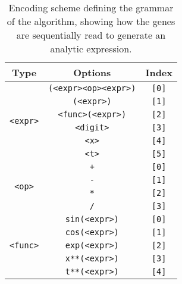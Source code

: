 \documentclass[multicolumn, 12pt]{extarticle}
\begin{document}
\begin{table}[h]
	\centering
	\caption{Encoding scheme defining the grammar of the algorithm, showing how the genes are sequentially read to generate an analytic expression.}
	\label{tab:grammar}
	\begin{tabular}{ccc}
		\toprule
		Type & Options                                         & Index                             \\
		\midrule

		\multirow{6}{*}{\texttt{<expr>}}
		     & \multicolumn{1}{c}{\texttt{(<expr><op><expr>)}} & \multicolumn{1}{c}{\texttt{[0]}}  \\
		     & \multicolumn{1}{c}{\texttt{(<expr>)}}           & \multicolumn{1}{c}{\texttt{[1]}}  \\
		     & \multicolumn{1}{c}{\texttt{<func>(<expr>)}}     & \multicolumn{1}{c}{\texttt{[2]}}  \\
		     & \multicolumn{1}{c}{\texttt{<digit>}}            & \multicolumn{1}{c}{\texttt{[3]}}  \\
		     & \multicolumn{1}{c}{\texttt{<x>}}                & \multicolumn{1}{c}{\texttt{[4]}}  \\
		     & \multicolumn{1}{c}{\texttt{<t>}}                & \multicolumn{1}{c}{\texttt{[5]}}  \\

		\midrule

		\multirow{4}{*}{\texttt{<op>}}
		     & \multicolumn{1}{c}{\texttt{+}}                  & \multicolumn{1}{c}{\texttt{[0]}}  \\
		     & \multicolumn{1}{c}{\texttt{-}}                  & \multicolumn{1}{c}{\texttt{[1]}}  \\
		     & \multicolumn{1}{c}{\texttt{*}}                  & \multicolumn{1}{c}{\texttt{[2]}}  \\
		     & \multicolumn{1}{c}{\texttt{/}}                  & \multicolumn{1}{c}{\texttt{[3]}}  \\

		\midrule

		\multirow{5}{*}{\texttt{<func>}}
		     & \multicolumn{1}{c}{\texttt{sin(<expr>)}}        & \multicolumn{1}{c}{\texttt{[0]}}  \\
		     & \multicolumn{1}{c}{\texttt{cos(<expr>)}}        & \multicolumn{1}{c}{\texttt{[1]}}  \\
		     & \multicolumn{1}{c}{\texttt{exp(<expr>)}}        & \multicolumn{1}{c}{\texttt{[2]}}  \\
		     & \multicolumn{1}{c}{\texttt{x**(<expr>)}}        & \multicolumn{1}{c}{\texttt{[3]}}  \\
		     & \multicolumn{1}{c}{\texttt{t**(<expr>)}}        & \multicolumn{1}{c}{\texttt{[4]}}  \\


\end{tabular}
\end{table}
\end{document}
